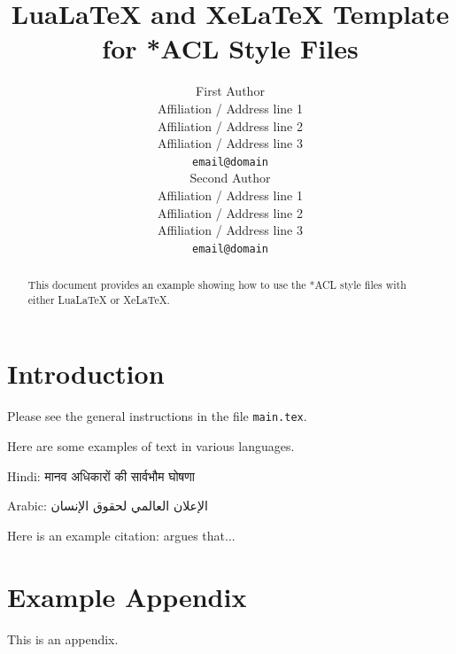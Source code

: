 \documentclass[11pt]{article}
\title{LuaLaTeX and XeLaTeX Template for *ACL Style Files}
\author{First Author \\
  Affiliation / Address line 1 \\
  Affiliation / Address line 2 \\
  Affiliation / Address line 3 \\
  \texttt{email@domain} \\\And
  Second Author \\
  Affiliation / Address line 1 \\
  Affiliation / Address line 2 \\
  Affiliation / Address line 3 \\
  \texttt{email@domain} \\}
\begin{document}
\maketitle
\begin{abstract}
This document provides an example showing how
to use the *ACL style files with either
LuaLaTeX or XeLaTeX.
\end{abstract}


\section{Introduction}

Please see the general instructions
in the file \verb|main.tex|.

Here are some examples of text in various languages.

Hindi: \foreignlanguage{hindi}{मानव अधिकारों की सार्वभौम घोषणा}

Arabic: \foreignlanguage{arabic}{الإعلان العالمي لحقوق الإنسان}

Here is an example citation:
\citet{Gusfield:97} argues that...


\printbibliography

\appendix

\section{Example Appendix}
\label{sec:appendix}

This is an appendix.
\end{document}
